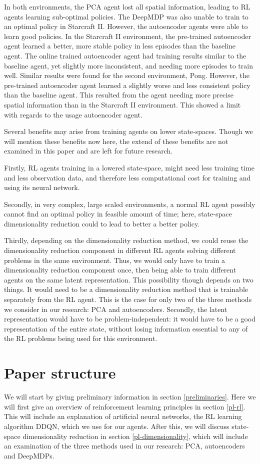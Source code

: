 In both environments, the PCA agent lost all spatial information, leading to RL agents learning sub-optimal policies. The DeepMDP was also unable to train to an optimal policy in Starcraft II. However, the autoencoder agents were able to learn good policies. In the Starcraft II environment, the pre-trained autoencoder agent learned a better, more stable policy in less episodes than the baseline agent. The online trained autoencoder agent had training results similar to the baseline agent, yet slightly more inconsistent, and needing more episodes to train well. Similar results were found for the second environment, Pong. However, the pre-trained autoencoder agent learned a slightly worse and less consistent policy than the baseline agent. This resulted from the agent needing more precise spatial information than in the Starcraft II environment. This showed a limit with regards to the usage autoencoder agent.

Several benefits may arise from training agents on lower state-spaces. Though we will mention these benefits now here, the extend of these benefits are not examined in this paper and are left for future research.

Firstly, RL agents training in a lowered state-space, might need less training time and less observation data, and therefore less computational cost for training and using its neural network. 

Secondly, in very complex, large scaled environments, a normal RL agent possibly cannot find an optimal policy in feasible amount of time; here, state-space dimensionality reduction could to lead to better a better policy. 

Thirdly, depending on the dimensionality reduction method, we could reuse the dimensionality reduction component in different RL agents solving different problems in the same environment. Thus, we would only have to train a dimensionality reduction component once, then being able to train different agents on the same latent representation. This possibility though depends on two things. It would need to be a dimensionality reduction method that is trainable separately from the RL agent. This is the case for only two of the three methods we consider in our research: PCA and autoencoders. Secondly, the latent representation would have to be problem-independent: it would have to be a good representation of the entire state, without losing information essential to any of the RL problems being used for this environment.

\section{Paper structure}
We will start by giving preliminary information in section \ref{preliminaries}. Here we will first give an overview of reinforcement learning principles in section \ref{pl-rl}. This will include an explanation of artificial neural networks, the RL learning algorithm DDQN, which we use for our agents. After this, we will discuss state-space dimensionality reduction in section \ref{pl-dimensionality}, which will include an examination of the three methods used in our research: PCA, autoencoders and DeepMDPs.

